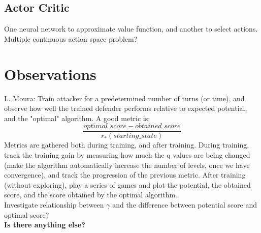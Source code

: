\documentclass{article}
\theoremstyle{plain}
\theoremstyle{definition}
\theoremstyle{remark}
\begin{document}
\subsection{Actor Critic}
One neural network to approximate value function, and another to select actions.
Multiple continuous action space problem?

\section{Observations}
L. Moura: Train attacker for a predetermined number of turns (or time), and observe how well the trained defender performs relative to expected potential, and the "optimal" algorithm. A good metric is:
\begin{equation*}
\frac{optimal\_score - obtained\_score}{r_{*}(starting\_state)}
\end{equation*}
Metrics are gathered both during training, and after training. During training, track the training gain by measuring how much the q values are being changed (make the algorithm automatically increase the number of levels, once we have convergence), and track the progression of the previous metric. After training (without exploring), play a series of games and plot the potential, the obtained score, and the score obtained by the optimal algorithm. \\

Investigate relationship between $\gamma$ and the difference between potential score and optimal score? \\

\textbf{Is there anything else?}

%
\end{document}
